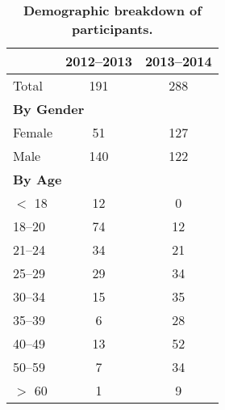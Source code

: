 \begin{table}[t]
\begin{tabularx}{\linewidth}{Xcc}

& \textbf{2012--2013}
& \textbf{2013--2014} \\ \toprule

Total & 191 & 288 \\[0.05in]

\multicolumn{3}{l}{\textbf{By Gender}} \\ \midrule
Female & 51 & 127 \\
Male & 140 & 122 \\[0.05in]

\multicolumn{3}{l}{\textbf{By Age}} \\ \midrule
$<$ 18 & 12 & 0 \\
18--20 & 74 & 12 \\
21--24 & 34 & 21 \\
25--29 & 29 & 34 \\
30--34 & 15 & 35 \\
35--39 & 6 & 28 \\
40--49 & 13 & 52 \\
50--59 & 7 & 34 \\
$>$ 60 & 1 & 9 \\

\end{tabularx}

\caption{\textbf{Demographic breakdown of \PhoneLab{} participants.}}

\vspace*{-0.2in}
\end{table}

